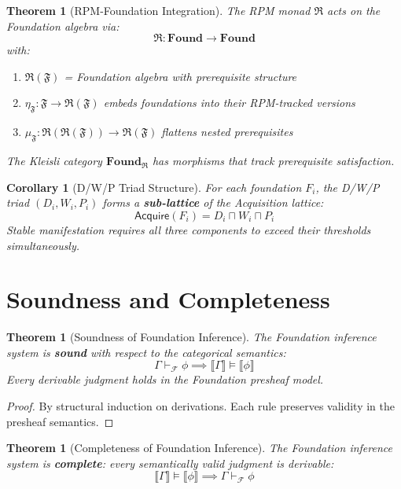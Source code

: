 \documentclass[11pt,twoside,openright]{book}
\theoremstyle{definition}
\theoremstyle{plain}
\newtheorem{theorem}[definition]{Theorem}
\newtheorem{corollary}[definition]{Corollary}
\theoremstyle{remark}
\newcommand{\sem}[1]{\llbracket #1 \rrbracket}
\newcommand{\Foundations}{\mathcal{F}}
\newcommand{\RPM}{\mathfrak{R}}
\begin{document}
\begin{theorem}[RPM-Foundation Integration]
\label{thm:rpm-foundation}
The RPM monad $\RPM$ acts on the Foundation algebra via:
\[
\RPM : \mathbf{Found} \to \mathbf{Found}
\]
with:
\begin{enumerate}[label=(\roman*)]
  \item $\RPM(\mathfrak{F})$ = Foundation algebra with prerequisite structure
  \item $\eta_\mathfrak{F} : \mathfrak{F} \to \RPM(\mathfrak{F})$ embeds foundations into their RPM-tracked versions
  \item $\mu_\mathfrak{F} : \RPM(\RPM(\mathfrak{F})) \to \RPM(\mathfrak{F})$ flattens nested prerequisites
\end{enumerate}
The Kleisli category $\mathbf{Found}_\RPM$ has morphisms that track prerequisite satisfaction.
\end{theorem}

\begin{corollary}[D/W/P Triad Structure]
\label{cor:dwp-triad}
For each foundation $F_i$, the D/W/P triad $(D_i, W_i, P_i)$ forms a \textbf{sub-lattice} of the Acquisition lattice:
\[
\mathsf{Acquire}(F_i) = D_i \sqcap W_i \sqcap P_i
\]
Stable manifestation requires all three components to exceed their thresholds simultaneously.
\end{corollary}

\section{Soundness and Completeness}
\label{sec:foundation-soundness}

\begin{theorem}[Soundness of Foundation Inference]
\label{thm:foundation-soundness}
The Foundation inference system is \textbf{sound} with respect to the categorical semantics:
\[
\Gamma \vdash_\Foundations \phi \implies \sem{\Gamma} \models \sem{\phi}
\]
Every derivable judgment holds in the Foundation presheaf model.
\end{theorem}

\begin{proof}
By structural induction on derivations. Each rule preserves validity in the presheaf semantics.
\end{proof}

\begin{theorem}[Completeness of Foundation Inference]
\label{thm:foundation-completeness-logic}
The Foundation inference system is \textbf{complete}: every semantically valid judgment is derivable:
\[
\sem{\Gamma} \models \sem{\phi} \implies \Gamma \vdash_\Foundations \phi
\]
\end{theorem}
\end{document}
